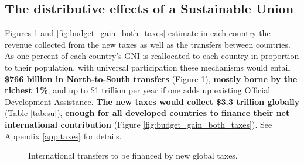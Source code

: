 \documentclass[12pt,english]{article}
\begin{document}
\subsection{The distributive effects of a Sustainable Union\label{subsec:distributive}}

Figures \ref{fig:gain_both_taxes} and \ref{fig:budget_gain_both_taxes} estimate in each country the revenue collected from the new taxes as well as the transfers between countries. %
As one percent of each country's GNI is reallocated to each country in proportion to their population, with universal participation these mechanisms would entail \textbf{\$766 billion in North-to-South transfers} (Figure \ref{fig:gain_both_taxes}), \textbf{mostly borne by the richest 1\%}, and up to \$1 trillion per year if one adds up existing Official Development Assistance. \textbf{The new taxes would collect \$3.3 trillion globally} (Table \ref{tab:su}), \textbf{enough for all developed countries to finance their net international contribution} (Figure \ref{fig:budget_gain_both_taxes}). See Appendix \ref{app:taxes} %
for details. 

\begin{figure}[h!] 
  \caption{International transfers to be financed by new global taxes.}\label{fig:gain_both_taxes}
\end{figure}
\end{document}
